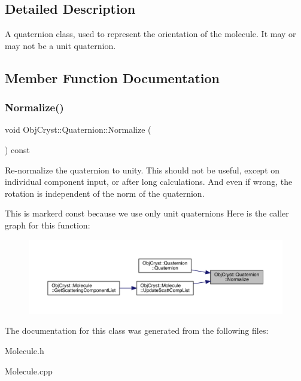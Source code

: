 \subsection{Detailed Description}
A quaternion class, used to represent the orientation of the molecule. It may or may not be a unit quaternion. 

\subsection{Member Function Documentation}
\mbox{\label{class_obj_cryst_1_1_quaternion_ac5a0461b9a89ce473a4d2c0dac73840d}} 
\subsubsection{\texorpdfstring{Normalize()}{Normalize()}}
{\footnotesize\ttfamily void Obj\+Cryst\+::\+Quaternion\+::\+Normalize (\begin{DoxyParamCaption}{ }\end{DoxyParamCaption}) const}

Re-\/normalize the quaternion to unity. This should not be useful, except on individual component input, or after long calculations. And even if wrong, the rotation is independent of the norm of the quaternion.

This is markerd const because we use only unit quaternions Here is the caller graph for this function\+:
\nopagebreak
\begin{figure}[H]
\begin{center}
\leavevmode
\includegraphics[width=350pt]{class_obj_cryst_1_1_quaternion_ac5a0461b9a89ce473a4d2c0dac73840d_icgraph}
\end{center}
\end{figure}


The documentation for this class was generated from the following files\+:\begin{DoxyCompactItemize}
\item 
Molecule.\+h\item 
Molecule.\+cpp\end{DoxyCompactItemize}
